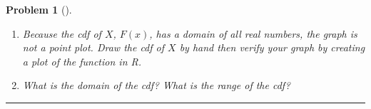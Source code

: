 \documentclass[letterpaper,oneside]{book}%
\theoremstyle{plain}
\theoremstyle{box}
\theoremstyle{problem}
\newtheorem{problemnum}{Problem}[chapter]
\newenvironment{problem}[1][]{\begin{problemnum}[#1]}{\end{problemnum}\nopagebreak\hrule\bigskip}
\begin{document}
\begin{problem}
\begin{enumerate}
\begin{itemize}
   \item $P(X\leq 1)$
   \item $P(X\leq 2)$
  \end{itemize}
  We can summarize the information above into a single piecewise defined function, such as
    $$F(x) = 
    \begin{cases}
    0 & x<0 \\
    \frac{1}{2} &0\leq x<1 \\
    1 & x \geq 1
    \end{cases}.$$
    We call this function the cummulative distribution function (cdf) of the random variable $X$. 
  \item  Because the cdf of $X$, $F(x)$, has a domain of all real numbers, the graph is not a point plot. Draw the cdf of $X$ by hand then verify your graph by creating a plot of the function in R.
  \item What is the domain of the cdf?  What is the range of the cdf?  
 \end{enumerate}

\end{problem}
\end{document}
